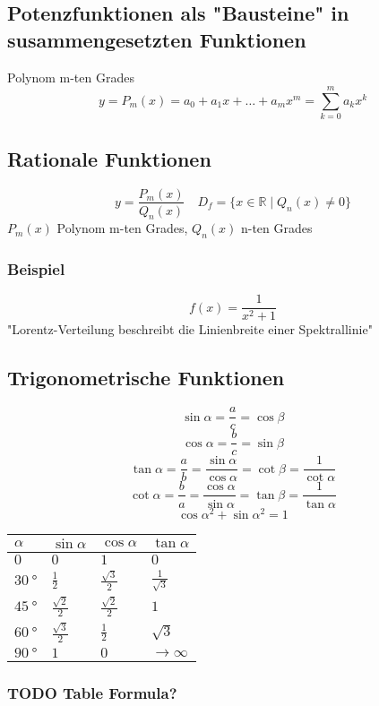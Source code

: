 \documentclass[11pt]{article}
\begin{document}
\subsection{Potenzfunktionen als "Bausteine" in susammengesetzten Funktionen}
\label{sec-5-5}
Polynom m-ten Grades \[y=P_m(x) = a_0 + a_1 x + \ldots + a_m x^m = \sum_{k=0}^m a_k x^k\]
\subsection{Rationale Funktionen}
\label{sec-5-6}
\[y=\frac{P_m(x)}{Q_n(x)}\quad D_f = \{x\in\mathbb{R}\mid Q_n(x)\neq 0\}\]
$P_m(x)$ Polynom m-ten Grades, $Q_n(x)$ n-ten Grades
\subsubsection{Beispiel}
\label{sec-5-6-1}
\[f(x) = \frac{1}{x^2 + 1}\]
"Lorentz-Verteilung beschreibt die Linienbreite einer Spektrallinie"
\subsection{Trigonometrische Funktionen}
\label{sec-5-7}
\[\sin{\alpha} = \frac{a}{c} = \cos{\beta}\]
\[\cos{\alpha} = \frac{b}{c} = \sin{\beta}\]
\[\tan{\alpha} = \frac{a}{b}=\frac{\sin{\alpha}}{\cos{\alpha}} = \cot{\beta} = \frac{1}{\cot{\alpha}}\]
\[\cot{\alpha} = \frac{b}{a}=\frac{\cos{\alpha}}{\sin{\alpha}} = \tan{\beta} = \frac{1}{\tan{\alpha}}\]
\[\cos{\alpha}^2 + \sin{\alpha}^2 = 1\]

\begin{center}
\begin{tabular}{llll}
$\alpha$ & $\sin{\alpha}$ & $\cos{\alpha}$ & $\tan{\alpha}$\\
\hline
$0$ & $0$ & $1$ & $0$\\
$\SI{30}{\degree}$ & $\frac{1}{2}$ & $\frac{\sqrt{3}}{2}$ & $\frac{1}{\sqrt{3}}$\\
$\SI{45}{\degree}$ & $\frac{\sqrt{2}}{2}$ & $\frac{\sqrt{2}}{2}$ & $1$\\
$\SI{60}{\degree}$ & $\frac{\sqrt{3}}{2}$ & $\frac{1}{2}$ & $\sqrt{3}$\\
$\SI{90}{\degree}$ & $1$ & $0$ & $\to\infty$\\
\end{tabular}
\end{center}
\subsubsection{{\bfseries\sffamily TODO} Table Formula?}
\label{sec-5-7-1}
\end{document}
